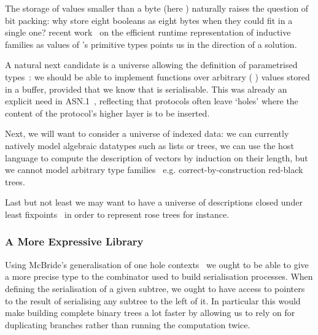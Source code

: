 The storage of values smaller than a byte (here ) naturally
raises the question of bit packing: why store eight booleans as eight bytes
when they could fit in a single one?
%
\iftoggle{BLIND}{Allais'}{Our} recent work~\cite{DBLP:conf/esop/Allais23}
on the efficient runtime representation of inductive families as values
of \idris{}'s primitive types points us in the direction of a solution.

A natural next candidate is a universe allowing the definition of parametrised
types~\cite{DBLP:conf/icfp/LohM11}: we should be able to implement functions over arbitrary
( ) values stored in a buffer,
provided that we know that  is serialisable.
%
This was already an explicit need in ASN.1~\cite{MANUAL:book/larmouth1999},
reflecting that protocols often leave `holes' where the content of
the protocol's higher layer is to be inserted.

Next, we will want to consider a universe of indexed data:
we can currently natively model algebraic datatypes such as lists or trees,
we can use the host language to compute the description of vectors by induction on their length,
but we cannot model arbitrary type families~\cite{DBLP:journals/fac/Dybjer94}
e.g. correct-by-construction red-black trees.

Last but not least we may want to have a universe of descriptions closed
under least fixpoints~\cite{DBLP:phd/ethos/Morris07}
in order to represent rose trees for instance.

\subsubsection{A More Expressive Library}

Using McBride's generalisation of one hole contexts~\cite{DBLP:conf/popl/McBride08}
we ought to be able to give a more precise type to the combinator
\IdrisFunction{(\#)} used to build serialisation processes.
%
When defining the serialisation of a given subtree, we ought to have access to
pointers to the result of serialising any subtree to the left of it. In particular
this would make building complete binary trees a lot faster by allowing us to rely
on  for duplicating branches rather than running the computation
twice.
